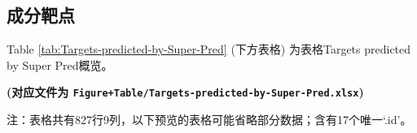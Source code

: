 \documentclass[
]{article}
\newenvironment{Shaded}{\begin{snugshade}}{\end{snugshade}}
\newcommand{\KeywordTok}[1]{\textcolor[rgb]{0.13,0.29,0.53}{\textbf{#1}}}
\newcommand{\NormalTok}[1]{#1}
\newcommand{\OperatorTok}[1]{\textcolor[rgb]{0.81,0.36,0.00}{\textbf{#1}}}
\newcommand{\StringTok}[1]{\textcolor[rgb]{0.31,0.60,0.02}{#1}}
\begin{document}
\begin{Shaded}
\end{Shaded}

\hypertarget{ux6210ux5206ux9776ux70b9}{%
\subsection{成分靶点}\label{ux6210ux5206ux9776ux70b9}}

\begin{Shaded}
\end{Shaded}

\begin{center}\vspace{1.5cm}\end{center}

Table \ref{tab:Targets-predicted-by-Super-Pred} (下方表格) 为表格Targets predicted by Super Pred概览。

\textbf{(对应文件为 \texttt{Figure+Table/Targets-predicted-by-Super-Pred.xlsx})}

\begin{center}\begin{tcolorbox}[colback=gray!10, colframe=gray!50, width=0.9\linewidth, arc=1mm, boxrule=0.5pt]注：表格共有827行9列，以下预览的表格可能省略部分数据；含有17个唯一`.id'。
\end{tcolorbox}
\end{center}
\end{document}
